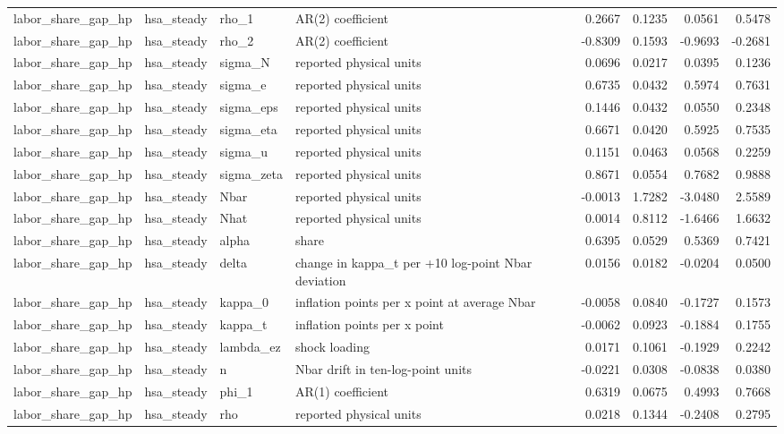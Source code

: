 \begin{tabular}{llllrrrr}
labor\_share\_gap\_hp & hsa\_steady & rho\_1 & AR(2) coefficient & 0.2667 & 0.1235 & 0.0561 & 0.5478 \\
labor\_share\_gap\_hp & hsa\_steady & rho\_2 & AR(2) coefficient & -0.8309 & 0.1593 & -0.9693 & -0.2681 \\
labor\_share\_gap\_hp & hsa\_steady & sigma\_N & reported physical units & 0.0696 & 0.0217 & 0.0395 & 0.1236 \\
labor\_share\_gap\_hp & hsa\_steady & sigma\_e & reported physical units & 0.6735 & 0.0432 & 0.5974 & 0.7631 \\
labor\_share\_gap\_hp & hsa\_steady & sigma\_eps & reported physical units & 0.1446 & 0.0432 & 0.0550 & 0.2348 \\
labor\_share\_gap\_hp & hsa\_steady & sigma\_eta & reported physical units & 0.6671 & 0.0420 & 0.5925 & 0.7535 \\
labor\_share\_gap\_hp & hsa\_steady & sigma\_u & reported physical units & 0.1151 & 0.0463 & 0.0568 & 0.2259 \\
labor\_share\_gap\_hp & hsa\_steady & sigma\_zeta & reported physical units & 0.8671 & 0.0554 & 0.7682 & 0.9888 \\
labor\_share\_gap\_hp & hsa\_steady & Nbar & reported physical units & -0.0013 & 1.7282 & -3.0480 & 2.5589 \\
labor\_share\_gap\_hp & hsa\_steady & Nhat & reported physical units & 0.0014 & 0.8112 & -1.6466 & 1.6632 \\
labor\_share\_gap\_hp & hsa\_steady & alpha & share & 0.6395 & 0.0529 & 0.5369 & 0.7421 \\
labor\_share\_gap\_hp & hsa\_steady & delta & change in kappa\_t per +10 log-point Nbar deviation & 0.0156 & 0.0182 & -0.0204 & 0.0500 \\
labor\_share\_gap\_hp & hsa\_steady & kappa\_0 & inflation points per x point at average Nbar & -0.0058 & 0.0840 & -0.1727 & 0.1573 \\
labor\_share\_gap\_hp & hsa\_steady & kappa\_t & inflation points per x point & -0.0062 & 0.0923 & -0.1884 & 0.1755 \\
labor\_share\_gap\_hp & hsa\_steady & lambda\_ez & shock loading & 0.0171 & 0.1061 & -0.1929 & 0.2242 \\
labor\_share\_gap\_hp & hsa\_steady & n & Nbar drift in ten-log-point units & -0.0221 & 0.0308 & -0.0838 & 0.0380 \\
labor\_share\_gap\_hp & hsa\_steady & phi\_1 & AR(1) coefficient & 0.6319 & 0.0675 & 0.4993 & 0.7668 \\
labor\_share\_gap\_hp & hsa\_steady & rho & reported physical units & 0.0218 & 0.1344 & -0.2408 & 0.2795 \\

\end{tabular}
